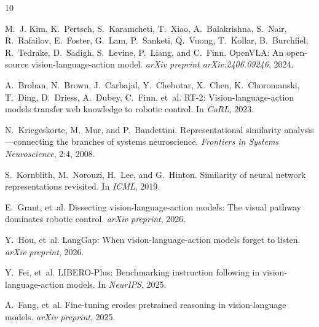 \documentclass[10pt,letterpaper]{article}
\begin{document}
{\small


\begin{thebibliography}{10}

M.~J. Kim, K.~Pertsch, S.~Karamcheti, T.~Xiao, A.~Balakrishna, S.~Nair, R.~Rafailov, E.~Foster, G.~Lam, P.~Sanketi, Q.~Vuong, T.~Kollar, B.~Burchfiel, R.~Tedrake, D.~Sadigh, S.~Levine, P.~Liang, and C.~Finn.
\newblock OpenVLA: An open-source vision-language-action model.
\newblock \emph{arXiv preprint arXiv:2406.09246}, 2024.

A.~Brohan, N.~Brown, J.~Carbajal, Y.~Chebotar, X.~Chen, K.~Choromanski, T.~Ding, D.~Driess, A.~Dubey, C.~Finn, et~al.
\newblock RT-2: Vision-language-action models transfer web knowledge to robotic control.
\newblock In \emph{CoRL}, 2023.

N.~Kriegeskorte, M.~Mur, and P.~Bandettini.
\newblock Representational similarity analysis---connecting the branches of systems neuroscience.
\newblock \emph{Frontiers in Systems Neuroscience}, 2:4, 2008.

S.~Kornblith, M.~Norouzi, H.~Lee, and G.~Hinton.
\newblock Similarity of neural network representations revisited.
\newblock In \emph{ICML}, 2019.

E.~Grant, et~al.
\newblock Dissecting vision-language-action models: The visual pathway dominates robotic control.
\newblock \emph{arXiv preprint}, 2026.

Y.~Hou, et~al.
\newblock LangGap: When vision-language-action models forget to listen.
\newblock \emph{arXiv preprint}, 2026.

Y.~Fei, et~al.
\newblock LIBERO-Plus: Benchmarking instruction following in vision-language-action models.
\newblock In \emph{NeurIPS}, 2025.

A.~Fang, et~al.
\newblock Fine-tuning erodes pretrained reasoning in vision-language models.
\newblock \emph{arXiv preprint}, 2025.

\end{thebibliography}
}
\end{document}
